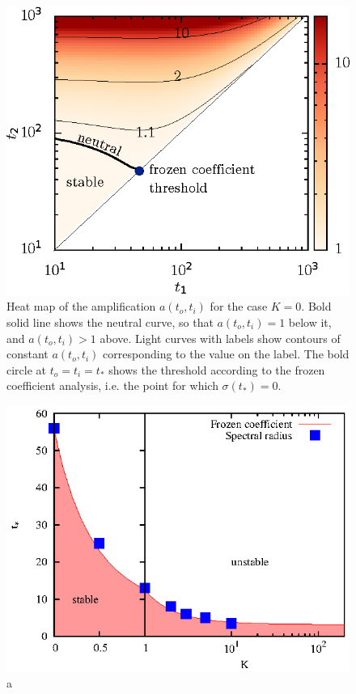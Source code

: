 \documentclass[letterpaper,prl,aps,twocolumn,reprint,superscriptaddress]{revtex4-1}
\newcommand{\tc}{t_*}
\newcommand{\obs}{o}
\newcommand{\inc}{i}
\begin{document}
\begin{figure}
 \centering
 \includegraphics{./Figures/Message}
 \caption{Heat map of the amplification $a(t_\obs, t_\inc)$ for the case $K=0$. Bold solid line shows the neutral curve, so that $a(t_\obs, t_\inc)=1$ below it, and $a(t_\obs,t_\inc)>1$ above. Light curves with labels show contours of constant $a(t_\obs,t_\inc)$ corresponding to the value on the label. The bold circle at $t_\obs = t_\inc = \tc$ shows the threshold according to the frozen coefficient analysis, i.e. the point for which $\sigma(\tc)=0$.}
 \label{fig:Message}
\end{figure}


\begin{figure}
 \centering
 \includegraphics{./Figures/Frozen.eps}
 \caption{a}
 \label{fig:Frozen}
\end{figure}
\end{document}
